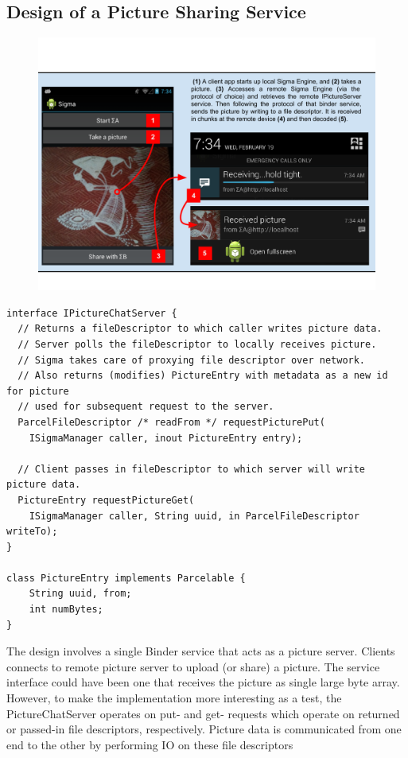 \documentclass[prodmode]{acmlarge}
\begin{document}
\subsection{Design of a Picture Sharing Service}
\begin{figure}[h]
\centering
\includegraphics[width=\textwidth]{drawings/PictureChatExample.pdf}
\end{figure}

\begin{Verbatim}[samepage=true]
interface IPictureChatServer {
  // Returns a fileDescriptor to which caller writes picture data.
  // Server polls the fileDescriptor to locally receives picture.
  // Sigma takes care of proxying file descriptor over network.
  // Also returns (modifies) PictureEntry with metadata as a new id for picture
  // used for subsequent request to the server.
  ParcelFileDescriptor /* readFrom */ requestPicturePut(
    ISigmaManager caller, inout PictureEntry entry);

  // Client passes in fileDescriptor to which server will write picture data.
  PictureEntry requestPictureGet(
    ISigmaManager caller, String uuid, in ParcelFileDescriptor writeTo);
}

class PictureEntry implements Parcelable {
    String uuid, from;
    int numBytes;
}
\end{Verbatim}

The design involves a single Binder service that acts as a picture server. Clients connects to remote picture server to upload (or share) a picture. The service interface could have been one that receives the picture as single large byte array. However, to make the implementation more interesting as a test, the PictureChatServer operates on put- and get- requests which operate on returned or passed-in file descriptors, respectively. Picture data is communicated from one end to the other by performing IO on these file descriptors
\end{document}
